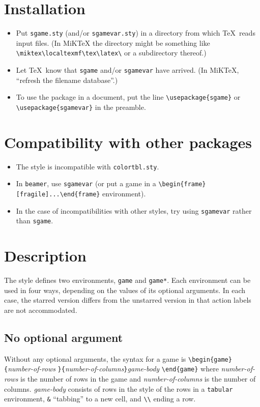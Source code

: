 \documentclass[12pt]{article}
\begin{document}
{\section{Installation}
\begin{itemize}
   \item Put \texttt{sgame.sty} (and/or \texttt{sgamevar.sty}) in a directory
from which \TeX\ reads input files.  (In MiKTeX the directory might be
something like \verb+\miktex\localtexmf\tex\latex\+ or a subdirectory
thereof.)
   \item Let \TeX\ know that \texttt{sgame} and/or \texttt{sgamevar} have
arrived.  (In MiKTeX, ``refresh the filename database''.)
 \item To use the package in a document, put the line
\verb+\usepackage{sgame}+ or \verb+\usepackage{sgamevar}+ in the preamble.
\end{itemize}
\section{Compatibility with other packages}
\begin{itemize}
   \item The style is incompatible with \verb+colortbl.sty+.
   \item In \verb+beamer+, use \verb+sgamevar+ (or put a game in a\newline
\verb+\begin{frame}[fragile]...\end{frame}+ environment).
   \item In the case of incompatibilities with other styles, try using
\verb+sgamevar+ rather than \verb+sgame+.
\end{itemize}
\section{Description}
The style defines two environments, \verb+game+ and \verb+game*+.  Each
environment can be used in four ways, depending on the values of its optional
arguments.  In each case, the starred version differs from the unstarred 
version in that action labels are not accommodated.
\subsection{No optional argument}
Without any optional arguments, the syntax for a game is\vspace*{4mm}\newline
\verb+\begin{game}{+\emph{number-of-rows}%
\verb+}{+\emph{number-of-columns}\verb+}+\emph{game-body}%
\verb+\end{game}+\vspace*{4mm}\newline
where \emph{number-of-rows} is the number of rows in the game and
\emph{number-of-columns} is the number of columns.  \emph{game-body} consists
of rows in the style of the rows in a \verb+tabular+ environment, \verb+&+
``tabbing'' to a new cell, and \verb+\\+ ending a row.

}
\end{document}
